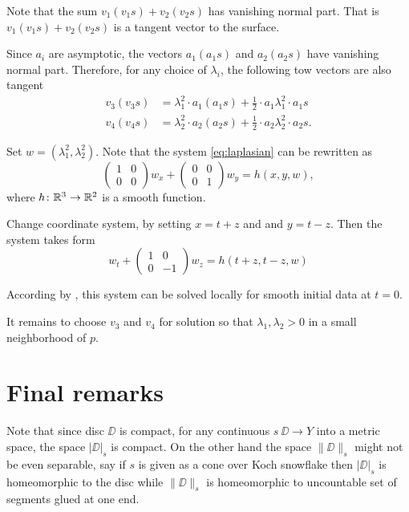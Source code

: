 \documentclass[a4paper,10pt]{amsart}
\begin{document}
Note that the sum $v_1(v_1s)+v_2(v_2s)$ has vanishing normal part.
That is $v_1(v_1s)+v_2(v_2s)$ is a tangent vector to the surface.

Since $a_i$ are asymptotic,
the vectors $a_1(a_1s)$ and $a_2(a_2s)$ have vanishing normal part.
Therefore, for any choice of $\lambda_i$,
the following tow vectors are also tangent
\begin{align*}
v_3(v_3s)&=\lambda_1^2\cdot a_1(a_1s)+\tfrac12\cdot a_1\lambda_1^2\cdot a_1s
\\
v_4(v_4s)&=\lambda_2^2\cdot a_2(a_2s)+\tfrac12\cdot a_2\lambda_2^2\cdot a_2s.
\end{align*}

Set $w=(\lambda_1^2,\lambda_2^2)$.
Note that the system \ref{eq:laplasian} can be rewritten as 
\[\left(\begin{smallmatrix}
   1&0\\0&0
  \end{smallmatrix}\right)
w_x
+
\left(\begin{smallmatrix}
   0&0\\0&1
  \end{smallmatrix}\right)
w_y=h(x,y,w),\]
where $h\colon\mathbb{R}^3\to\mathbb{R}^2$ is a smooth function.

Change coordinate system, by setting $x=t+z$ and  and $y=t-z$.
Then the system takes form 
\[w_t+\left(\begin{smallmatrix}
   1&0\\0&-1
  \end{smallmatrix}\right)
w_z=h(t+z,t-z,w)\]

According by \cite[Theorem 3.6]{bressan}, this system can be solved locally for smooth initial data at $t=0$.

It remains to choose $v_3$ and $v_4$ for solution so that $\lambda_1, \lambda_2>0$ in a small neighborhood of $p$.
\qeds


\section{Final remarks}

Note that since disc $\DD$ is compact, 
for any continuous $s\:\DD\to Y$ into a metric space,
the space $|\DD|_s$ is compact.
On the other hand the space $\|\DD\|_s$ might not be even separable,
say if $s$ is given as a cone over Koch snowflake then 
$|\DD|_s$ is homeomorphic to the disc while $\|\DD\|_s$ is homeomorphic to uncountable set of segments glued at one end.
\end{document}
